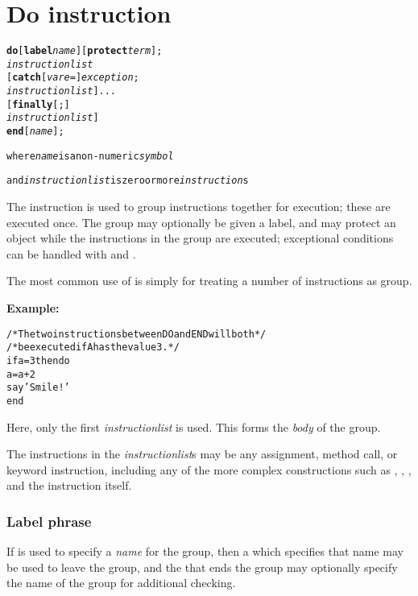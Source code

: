 \chapter{Do instruction}\label{refdo}
\index{,}
\index{,}
\index{,}
\begin{shaded}
\begin{alltt}
\textbf{do} [\textbf{label} \emph{name}] [\textbf{protect} \emph{term}];
        \emph{instructionlist}
    [\textbf{catch} [\emph{vare} =] \emph{exception};
        \emph{instructionlist}]...
    [\textbf{finally}[;]
        \emph{instructionlist}]
    \textbf{end} [\emph{name}];

where \emph{name} is a non-numeric \emph{symbol}

and \emph{instructionlist} is zero or more \emph{instruction}s
\end{alltt}
\end{shaded}
 The  instruction is used to group instructions together for
execution; these are executed once.
The group may optionally be given a label, and may protect an object
while the instructions in the group are executed; exceptional conditions
can be handled with  and .
 
The most common use of  is simply for treating a number of
instructions as group.

\textbf{Example:}
\begin{alltt}
/* The two instructions between DO and END will both */
/* be executed if A has the value 3.                 */
if a=3 then do
  a=a+2
  say 'Smile!'
  end
\end{alltt}
Here, only the first \emph{instructionlist} is used.
This forms the \emph{body} of the group.
 
The instructions in the \emph{instructionlist}s may be any assignment,
method call, or keyword instruction, including any of the more complex
constructions such as , , , and
the  instruction itself.
\subsection{Label phrase}
 
If  is used to specify a \emph{name} for the group,
then a  which specifies that name may be used to leave the
group, and the  that ends the group may optionally specify
the name of the group for additional checking.

